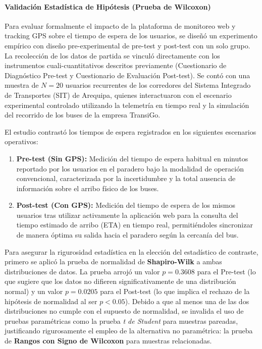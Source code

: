 \paragraph{Validación Estadística de Hipótesis (Prueba de Wilcoxon)}

Para evaluar formalmente el impacto de la plataforma de monitoreo web y tracking GPS sobre el tiempo de espera de los usuarios, se diseñó un experimento empírico con diseño pre-experimental de pre-test y post-test con un solo grupo. La recolección de los datos de partida se vinculó directamente con los instrumentos cuali-cuantitativos descritos previamente (Cuestionario de Diagnóstico Pre-test y Cuestionario de Evaluación Post-test). Se contó con una muestra de $N = 20$ usuarios recurrentes de los corredores del Sistema Integrado de Transportes (SIT) de Arequipa, quienes interactuaron con el escenario experimental controlado utilizando la telemetría en tiempo real y la simulación del recorrido de los buses de la empresa TransiGo.

El estudio contrastó los tiempos de espera registrados en los siguientes escenarios operativos:
\begin{enumerate}
    \item \textbf{Pre-test (Sin GPS):} Medición del tiempo de espera habitual en minutos reportado por los usuarios en el paradero bajo la modalidad de operación convencional, caracterizada por la incertidumbre y la total ausencia de información sobre el arribo físico de los buses.
    \item \textbf{Post-test (Con GPS):} Medición del tiempo de espera de los mismos usuarios tras utilizar activamente la aplicación web para la consulta del tiempo estimado de arribo (ETA) en tiempo real, permitiéndoles sincronizar de manera óptima su salida hacia el paradero según la cercanía del bus.
\end{enumerate}

Para asegurar la rigurosidad estadística en la elección del estadístico de contraste, primero se aplicó la prueba de normalidad de \textbf{Shapiro-Wilk} a ambas distribuciones de datos. La prueba arrojó un valor $p = 0.3608$ para el Pre-test (lo que sugiere que los datos no difieren significativamente de una distribución normal) y un valor $p = 0.0205$ para el Post-test (lo que implica el rechazo de la hipótesis de normalidad al ser $p < 0.05$). Debido a que al menos una de las dos distribuciones no cumple con el supuesto de normalidad, se invalida el uso de pruebas paramétricas como la prueba \textit{t de Student} para muestras pareadas, justificando rigurosamente el empleo de la alternativa no paramétrica: la prueba de \textbf{Rangos con Signo de Wilcoxon} para muestras relacionadas.

